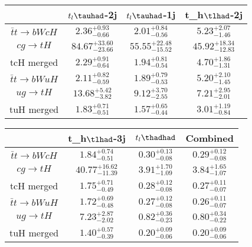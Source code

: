 \centering
\begin{tabular}{|c|c|c|c|} \hline
 & $t_l\tauhad$-2j & $t_l\tauhad$-1j & t_h$\tlhad$-2j\\\hline
$\bar{t}t\to bWcH$ & $2.36^{+0.93}_{-0.66}$ & $2.01^{+0.84}_{-0.56}$ & $5.23^{+2.07}_{-1.46}$\\\hline
$cg\to tH$ & $84.67^{+33.60}_{-23.66}$ & $55.55^{+22.48}_{-15.52}$ & $45.92^{+18.34}_{-12.83}$\\\hline
tcH merged & $2.29^{+0.91}_{-0.64}$ & $1.94^{+0.81}_{-0.54}$ & $4.70^{+1.86}_{-1.31}$\\\hline
$\bar{t}t\to bWuH$ & $2.11^{+0.82}_{-0.59}$ & $1.89^{+0.79}_{-0.53}$ & $5.20^{+2.10}_{-1.45}$\\\hline
$ug\to tH$ & $13.68^{+5.42}_{-3.82}$ & $9.12^{+3.70}_{-2.55}$ & $7.21^{+2.95}_{-2.01}$\\\hline
tuH merged & $1.83^{+0.71}_{-0.51}$ & $1.57^{+0.65}_{-0.44}$ & $3.01^{+1.19}_{-0.84}$\\\hline
\end{tabular}
\begin{tabular}{|c|c|c|c|} \hline
 & t_h$\tlhad$-3j & $t_l\thadhad$ & Combined\\\hline
$\bar{t}t\to bWcH$ & $1.84^{+0.74}_{-0.51}$ & $0.30^{+0.13}_{-0.08}$ & $0.29^{+0.12}_{-0.08}$\\\hline
$cg\to tH$ & $40.77^{+16.62}_{-11.39}$ & $3.91^{+1.70}_{-1.09}$ & $3.84^{+1.65}_{-1.07}$\\\hline
tcH merged & $1.75^{+0.71}_{-0.49}$ & $0.28^{+0.12}_{-0.08}$ & $0.27^{+0.11}_{-0.07}$\\\hline
$\bar{t}t\to bWuH$ & $1.72^{+0.69}_{-0.48}$ & $0.27^{+0.12}_{-0.08}$ & $0.26^{+0.11}_{-0.07}$\\\hline
$ug\to tH$ & $7.23^{+2.87}_{-2.02}$ & $0.82^{+0.36}_{-0.23}$ & $0.80^{+0.34}_{-0.22}$\\\hline
tuH merged & $1.40^{+0.57}_{-0.39}$ & $0.20^{+0.09}_{-0.06}$ & $0.20^{+0.09}_{-0.06}$\\\hline
\end{tabular}
